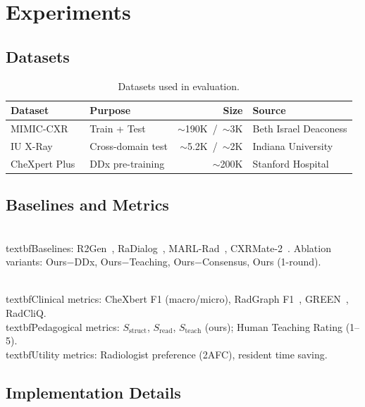 \documentclass[runningheads,10pt]{llncs}
\newcommand{\Sstruct}{S_{\text{struct}}}
\newcommand{\Sread}{S_{\text{read}}}
\newcommand{\Steach}{S_{\text{teach}}}
\begin{document}
\section{Experiments}

\subsection{Datasets}

\begin{table}[t]
\centering
\caption{Datasets used in evaluation.}
\label{tab:datasets}
\begin{tabular}{llrl}
\toprule
Dataset & Purpose & Size & Source \\
\midrule
MIMIC-CXR~\cite{mimiccxr} & Train + Test & $\sim$190K~/~$\sim$3K & Beth Israel Deaconess \\
IU X-Ray & Cross-domain test & $\sim$5.2K~/~$\sim$2K & Indiana University \\
CheXpert Plus~\cite{chexpert} & DDx pre-training & $\sim$200K & Stanford Hospital \\
\bottomrule
\end{tabular}
\end{table}

\subsection{Baselines and Metrics}

\\textbf{Baselines:} R2Gen~\cite{r2gen}, RaDialog~\cite{radialog}, MARL-Rad~\cite{marlrad}, CXRMate-2~\cite{cxrmate2}. Ablation variants: Ours$-$DDx, Ours$-$Teaching, Ours$-$Consensus, Ours (1-round).

\\textbf{Clinical metrics:} CheXbert F1 (macro/micro), RadGraph F1~\cite{radgraph}, GREEN~\cite{green}, RadCliQ.
\\textbf{Pedagogical metrics:} $\Sstruct$, $\Sread$, $\Steach$ (ours); Human Teaching Rating (1--5).
\\textbf{Utility metrics:} Radiologist preference (2AFC), resident time saving.

\subsection{Implementation Details}
\end{document}

